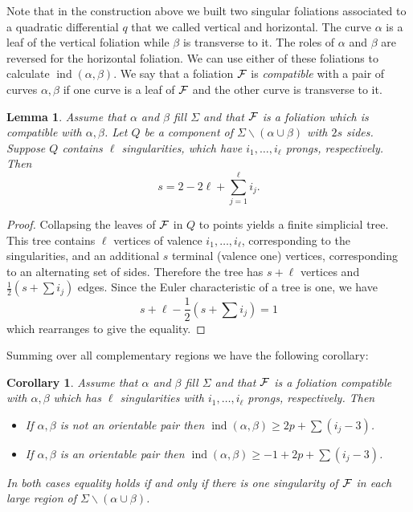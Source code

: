 \documentclass[11pt]{article}
\newtheorem{lemma}[thm]{Lemma}
\newtheorem{cor}[thm]{Corollary}
\theoremstyle{remark}
\def\ind{\operatorname{ind}}
\newcommand{\cF}{{\cal F}}
\begin{document}
Note that in the construction above we built two singular foliations associated to a
quadratic differential $q$ that we called vertical and horizontal. The curve $\alpha$
is a leaf of the vertical foliation while $\beta$ is transverse to it. The roles of
$\alpha$ and $\beta$ are reversed for the horizontal foliation. We can use  either of
these foliations to calculate $\ind(\alpha,\beta)$. We say that a foliation $\cF$ is
{\em compatible} with a pair of curves $\alpha,\beta$ if one curve is a leaf of
$\cF$ and the other curve is transverse to it.

\begin{lemma}\label{side count}
Assume that $\alpha$ and $\beta$ fill $\Sigma$ and that $\cF$ is a foliation which is
compatible with $\alpha,\beta$. Let $Q$ be a component of
$\Sigma\smallsetminus (\alpha\cup \beta)$ with $2s$ sides. Suppose $Q$ contains
$\ell$ singularities, which have $i_1, \dots, i_\ell$ prongs, respectively. Then
$$s = 2-2\ell + \sum_{j=1}^\ell i_j.$$
\end{lemma}

\begin{proof}
Collapsing the leaves of $\cF$ in $Q$ to points yields a finite simplicial tree.
This tree contains $\ell$ vertices of valence $i_1, \dots, i_\ell$, corresponding to
the singularities, and an additional $s$ terminal (valence one) vertices,
corresponding to an alternating set of sides. Therefore the tree has
$s+\ell$ vertices and $\frac12(s + \sum i_j)$ edges. Since the Euler characteristic
of a tree is one, we have
$$s + \ell -\frac12\left( s+ \sum i_j\right) = 1$$
which rearranges to give the equality.
\end{proof}

Summing over all complementary regions we have the following corollary:
\begin{cor}\label{one singularity}
Assume that $\alpha$ and $\beta$ fill $\Sigma$ and that $\cF$ is a foliation compatible with
$\alpha,\beta$ which has $\ell$ singularities with $i_1, \dots, i_\ell$ prongs,
respectively.
Then
\begin{itemize}
\item If $\alpha,\beta$ is not an orientable pair then $\ind(\alpha, \beta) \ge 2p + \sum(i_j - 3)$.

\item If $\alpha,\beta$ is an orientable pair then $\ind(\alpha, \beta) \ge -1+ 2p + \sum(i_j - 3)$.

\end{itemize}
In both cases equality holds if and only if there is one singularity of $\cF$ in each large region of $\Sigma \smallsetminus (\alpha\cup\beta)$.
\end{cor}
\end{document}
